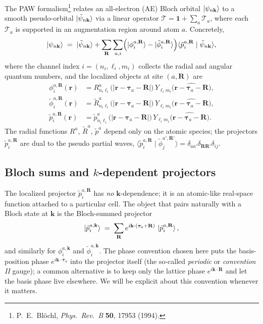 \documentclass[11pt,a4paper]{article}
\newcommand{\rr}{\mathbf{r}}
\newcommand{\kk}{\mathbf{k}}
\newcommand{\RR}{\mathbf{R}}
\newcommand{\tautau}{\boldsymbol{\tau}}
\begin{document}
The PAW formalism\footnote{P.~E.~Bl\"ochl, \emph{Phys.~Rev.~B} \textbf{50},
17953 (1994).} relates an all-electron (AE) Bloch orbital
$\ket{\psi_{n\kk}}$ to a smooth pseudo-orbital $\ket{\tilde\psi_{n\kk}}$ via
a linear operator $\mathcal{T} = \mathbf{1} + \sum_a \mathcal{T}_a$, where each
$\mathcal{T}_a$ is supported in an augmentation region around atom $a$.
Concretely,
\begin{equation}
\ket{\psi_{n\kk}}
\;=\; \ket{\tilde\psi_{n\kk}}
+ \sum_{\RR}\sum_{a,i}
   \Bigl(\ket{\phi_i^{a,\RR}} - \ket{\tilde\phi_i^{a,\RR}}\Bigr)
   \langle \tilde p_i^{a,\RR} \mid \tilde\psi_{n\kk}\rangle,
\label{eq:paw-real}
\end{equation}
where the channel index $i = (n_i,\ell_i,m_i)$ collects the radial and angular
quantum numbers, and the localized objects at site $(a,\RR)$ are
\begin{align}
\phi_i^{a,\RR}(\rr)
   &= R_{n_i\ell_i}^{a}\!\bigl(|\rr - \tautau_a - \RR|\bigr)\,
      Y_{\ell_i m_i}\!\bigl(\widehat{\rr - \tautau_a - \RR}\bigr), \\
\tilde\phi_i^{a,\RR}(\rr)
   &= \tilde R_{n_i\ell_i}^{a}\!\bigl(|\rr - \tautau_a - \RR|\bigr)\,
      Y_{\ell_i m_i}\!\bigl(\widehat{\rr - \tautau_a - \RR}\bigr), \\
\tilde p_i^{a,\RR}(\rr)
   &= \tilde p_{n_i\ell_i}^{a}\!\bigl(|\rr - \tautau_a - \RR|\bigr)\,
      Y_{\ell_i m_i}\!\bigl(\widehat{\rr - \tautau_a - \RR}\bigr).
\end{align}
The radial functions $R^a$, $\tilde R^a$, $\tilde p^a$ depend only on the atomic
species; the projectors $\tilde p_i^{a,\RR}$ are dual to the pseudo partial
waves, $\langle \tilde p_i^{a,\RR}\mid \tilde\phi_j^{a',\RR'}\rangle =
\delta_{aa'}\delta_{\RR\RR'}\delta_{ij}$.

\subsection{Bloch sums and $k$-dependent projectors}

The localized projector $\tilde p_i^{a,\RR}$ has \emph{no} $\kk$-dependence;
it is an atomic-like real-space function attached to a particular cell. The
object that pairs naturally with a Bloch state at $\kk$ is the Bloch-summed
projector
\begin{equation}
\ket{\tilde p_i^{a,\kk}}
\;=\; \sum_{\RR} e^{i\kk\cdot(\tautau_a + \RR)}\,\ket{\tilde p_i^{a,\RR}},
\label{eq:bloch-projector}
\end{equation}
and similarly for $\phi_i^{a,\kk}$ and $\tilde\phi_i^{a,\kk}$. The
phase convention chosen here puts the basis-position phase
$e^{i\kk\cdot\tautau_a}$ into the projector itself (the so-called
\emph{periodic} or \emph{convention II} gauge); a common alternative is to
keep only the lattice phase $e^{i\kk\cdot\RR}$ and let the basis phase live
elsewhere. We will be explicit about this convention whenever it matters.
\end{document}

